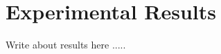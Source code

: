 
\setcounter{secnumdepth}{5}
\chapter{Experimental Results}
\thispagestyle{empty}
\glsresetall
\label{Chapter4}

Write about results here .....

\newpage